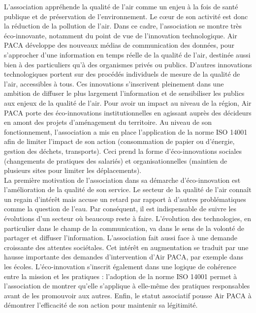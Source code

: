         L’association appréhende la qualité de l’air comme un enjeu à la fois de santé publique et de préservation de l’environnement. Le cœur de son activité est donc la réduction de la pollution de l’air. Dans ce cadre, l’association se montre très éco-innovante, notamment du point de vue de l’innovation technologique. Air PACA développe des nouveaux médias de communication des données, pour s’approcher d’une information en temps réelle de la qualité de l’air, destinée aussi bien à des particuliers qu’à des organismes privés ou publics. D’autres innovations technologiques portent sur des procédés individuels de mesure de la qualité de l’air, accessibles à tous.
        Ces innovations s’inscrivent pleinement dans une ambition de diffuser le plus largement l’information et de sensibiliser les publics aux enjeux de la qualité de l’air. Pour avoir un impact au niveau de la région, Air PACA porte des éco-innovations institutionnelles en agissant auprès des décideurs en amont des projets d’aménagement du territoire. Au niveau de son fonctionnement, l’association a mis en place l’application de la norme ISO 14001 afin de limiter l’impact de son action (consommation de papier ou d’énergie, gestion des déchets, transports). Ceci prend la forme d’éco-innovations sociales (changements de pratiques des salariés) et organisationnelles (maintien de plusieurs sites pour limiter les déplacements). \\


        La première motivation de l’association dans sa démarche d’éco-innovation est l’amélioration de la qualité de son service. Le secteur de la qualité de l’air connaît un regain d’intérêt mais accuse un retard par rapport à d’autres problématiques comme la question de l’eau. Par conséquent, il est indispensable de suivre les évolutions d’un secteur où beaucoup reste à faire.
        L’évolution des technologies, en particulier dans le champ de la communication, va dans le sens de la volonté de partager et diffuser l’information.
        L’association fait aussi face à une demande croissante des attentes sociétales. Cet intérêt en augmentation se traduit par une hausse importante des demandes d’intervention d’Air PACA, par exemple dans les écoles.
        L’éco-innovation s’inscrit également dans une logique de cohérence entre la mission et les pratiques : l’adoption de la norme ISO 14001 permet à l’association de montrer qu’elle s’applique à elle-même des pratiques responsables avant de les promouvoir aux autres.
        Enfin, le statut associatif pousse Air PACA à démontrer l’efficacité de son action pour maintenir sa légitimité. \\

